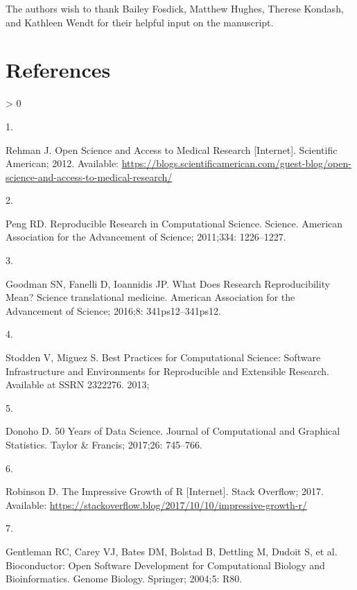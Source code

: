 \documentclass[10pt,letterpaper]{article}
\newlength{\csllabelwidth}
\newlength{\cslhangindent}
\newenvironment{CSLReferences}[3] %
 {%
  \setlength{\parindent}{0pt}
  \ifodd #1 \everypar{\setlength{\hangindent}{\cslhangindent}}\ignorespaces\fi
  \ifnum #2 > 0
  \setlength{\parskip}{#2\baselineskip}
  \fi
 }%
 {}
\newcommand{\CSLLeftMargin}[1]{\parbox[t]{\csllabelwidth}{#1}}
\newcommand{\CSLRightInline}[1]{\parbox[t]{\linewidth - \csllabelwidth}{#1}}
\begin{document}
The authors wish to thank Bailey Fosdick, Matthew Hughes, Therese
Kondash, and Kathleen Wendt for their helpful input on the manuscript.

\hypertarget{references}{%
\section*{References}\label{references}}

\hypertarget{refs}{}
\begin{CSLReferences}{0}{0}
\leavevmode\hypertarget{ref-rehman2012}{}%
\CSLLeftMargin{1. }
\CSLRightInline{Rehman J. {Open Science and Access to Medical Research}
{[}Internet{]}. Scientific American; 2012. Available:
\url{https://blogs.scientificamerican.com/guest-blog/open-science-and-access-to-medical-research/}}

\leavevmode\hypertarget{ref-peng2011}{}%
\CSLLeftMargin{2. }
\CSLRightInline{Peng RD. {Reproducible Research in Computational
Science}. Science. American Association for the Advancement of Science;
2011;334: 1226--1227. }

\leavevmode\hypertarget{ref-goodman2016}{}%
\CSLLeftMargin{3. }
\CSLRightInline{Goodman SN, Fanelli D, Ioannidis JP. {What Does Research
Reproducibility Mean?} Science translational medicine. American
Association for the Advancement of Science; 2016;8: 341ps12--341ps12. }

\leavevmode\hypertarget{ref-stodden2013}{}%
\CSLLeftMargin{4. }
\CSLRightInline{Stodden V, Miguez S. {Best Practices for Computational
Science: Software Infrastructure and Environments for Reproducible and
Extensible Research}. Available at SSRN 2322276. 2013; }

\leavevmode\hypertarget{ref-donoho2017}{}%
\CSLLeftMargin{5. }
\CSLRightInline{Donoho D. {50 Years of Data Science}. Journal of
Computational and Graphical Statistics. Taylor \& Francis; 2017;26:
745--766. }

\leavevmode\hypertarget{ref-robinson2017}{}%
\CSLLeftMargin{6. }
\CSLRightInline{Robinson D. {The Impressive Growth of R} {[}Internet{]}.
Stack Overflow; 2017. Available:
\url{https://stackoverflow.blog/2017/10/10/impressive-growth-r/}}

\leavevmode\hypertarget{ref-gentleman2004}{}%
\CSLLeftMargin{7. }
\CSLRightInline{Gentleman RC, Carey VJ, Bates DM, Bolstad B, Dettling M,
Dudoit S, et al. {Bioconductor: Open Software Development for
Computational Biology and Bioinformatics}. Genome Biology. Springer;
2004;5: R80. }


\end{CSLReferences}
\end{document}
